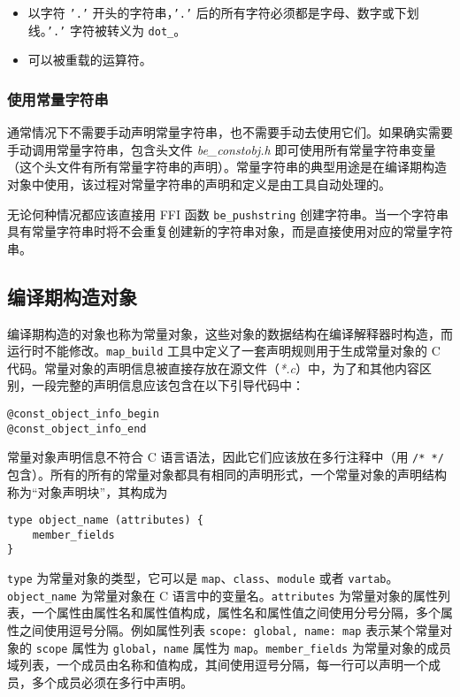 \begin{itemize}
    \item 以字符 \texttt{'.'} 开头的字符串，\texttt{'.'} 后的所有字符必须都是字母、数字或下划线。\texttt{'.'} 字符被转义为 \texttt{dot\_}。
    \item 可以被重载的运算符。
\end{itemize}

\subsubsection{使用常量字符串}

通常情况下不需要手动声明常量字符串，也不需要手动去使用它们。如果确实需要手动调用常量字符串，包含头文件 \textsl{be\_constobj.h} 即可使用所有常量字符串变量（这个头文件有所有常量字符串的声明）。常量字符串的典型用途是在编译期构造对象中使用，该过程对常量字符串的声明和定义是由工具自动处理的。

无论何种情况都应该直接用 FFI 函数 \texttt{be\_pushstring} 创建字符串。当一个字符串具有常量字符串时将不会重复创建新的字符串对象，而是直接使用对应的常量字符串。

\subsection{编译期构造对象}

编译期构造的对象也称为常量对象，这些对象的数据结构在编译解释器时构造，而运行时不能修改。\texttt{map\_build} 工具中定义了一套声明规则用于生成常量对象的 C 代码。常量对象的声明信息被直接存放在源文件（\textsl{*.c}）中，为了和其他内容区别，一段完整的声明信息应该包含在以下引导代码中：
\begin{lstlisting}[numbers=none]
@const_object_info_begin
@const_object_info_end
\end{lstlisting}
常量对象声明信息不符合 C 语言语法，因此它们应该放在多行注释中（用 \texttt{/* */} 包含）。所有的所有的常量对象都具有相同的声明形式，一个常量对象的声明结构称为“对象声明块”，其构成为
\begin{lstlisting}[numbers=none]
type object_name (attributes) {
    member_fields
}
\end{lstlisting}
\texttt{type} 为常量对象的类型，它可以是 \texttt{map}、\texttt{class}、\texttt{module} 或者 \texttt{vartab}。\texttt{object\_name} 为常量对象在 C 语言中的变量名。\texttt{attributes} 为常量对象的属性列表，一个属性由属性名和属性值构成，属性名和属性值之间使用分号分隔，多个属性之间使用逗号分隔。例如属性列表 \texttt{scope: global, name: map} 表示某个常量对象的 \texttt{scope} 属性为 \texttt{global}，\texttt{name} 属性为 \texttt{map}。\texttt{member\_fields} 为常量对象的成员域列表，一个成员由名称和值构成，其间使用逗号分隔，每一行可以声明一个成员，多个成员必须在多行中声明。

